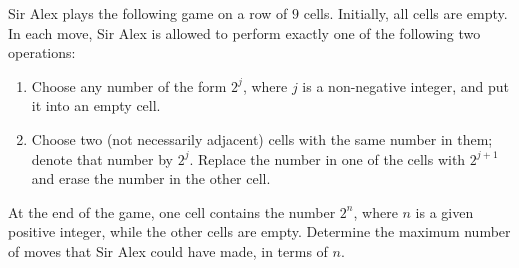 Sir Alex plays the following game on a row of $9$ cells. Initially, all cells are empty. In each move, Sir Alex is allowed to perform exactly one of the following two operations:
\begin{enumerate}
\item[(1)] Choose any number of the form $2^j$, where $j$ is a non-negative integer, and put it into an empty cell.
\item[(2)] Choose two (not necessarily adjacent) cells with the same number in them; denote that number by $2^j$. Replace the number in one of the cells with $2^{j+1}$ and erase the number in the other cell.
\end{enumerate}
At the end of the game, one cell contains the number $2^n$, where $n$ is a given positive integer, while the other cells are empty. Determine the maximum number of moves that Sir Alex could have made, in terms of $n$.

